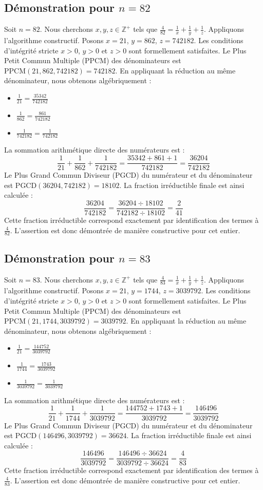 \documentclass[11pt,a4paper]{article}
\begin{document}
\subsection{Démonstration pour $n = 82$}
Soit $n = 82$. Nous cherchons $x, y, z \in \mathbb{Z}^{+}$ tels que $\frac{4}{82} = \frac{1}{x} + \frac{1}{y} + \frac{1}{z}$.
Appliquons l'algorithme constructif. Posons $x = 21$, $y = 862$, $z = 742182$.
Les conditions d'intégrité stricte $x > 0$, $y > 0$ et $z > 0$ sont formellement satisfaites.
Le Plus Petit Commun Multiple (PPCM) des dénominateurs est $\text{PPCM}(21, 862, 742182) = 742182$.
En appliquant la réduction au même dénominateur, nous obtenons algébriquement :
\begin{itemize}
    \item $\frac{1}{21} = \frac{35342}{742182}$
    \item $\frac{1}{862} = \frac{861}{742182}$
    \item $\frac{1}{742182} = \frac{1}{742182}$
\end{itemize}
La sommation arithmétique directe des numérateurs est :
$$ \frac{1}{21} + \frac{1}{862} + \frac{1}{742182} = \frac{35342 + 861 + 1}{742182} = \frac{36204}{742182} $$
Le Plus Grand Commun Diviseur (PGCD) du numérateur et du dénominateur est $\text{PGCD}(36204, 742182) = 18102$.
La fraction irréductible finale est ainsi calculée :
$$ \frac{36204}{742182} = \frac{36204 \div 18102}{742182 \div 18102} = \frac{2}{41} $$
Cette fraction irréductible correspond exactement par identification des termes à $\frac{4}{82}$. L'assertion est donc démontrée de manière constructive pour cet entier.

\subsection{Démonstration pour $n = 83$}
Soit $n = 83$. Nous cherchons $x, y, z \in \mathbb{Z}^{+}$ tels que $\frac{4}{83} = \frac{1}{x} + \frac{1}{y} + \frac{1}{z}$.
Appliquons l'algorithme constructif. Posons $x = 21$, $y = 1744$, $z = 3039792$.
Les conditions d'intégrité stricte $x > 0$, $y > 0$ et $z > 0$ sont formellement satisfaites.
Le Plus Petit Commun Multiple (PPCM) des dénominateurs est $\text{PPCM}(21, 1744, 3039792) = 3039792$.
En appliquant la réduction au même dénominateur, nous obtenons algébriquement :
\begin{itemize}
    \item $\frac{1}{21} = \frac{144752}{3039792}$
    \item $\frac{1}{1744} = \frac{1743}{3039792}$
    \item $\frac{1}{3039792} = \frac{1}{3039792}$
\end{itemize}
La sommation arithmétique directe des numérateurs est :
$$ \frac{1}{21} + \frac{1}{1744} + \frac{1}{3039792} = \frac{144752 + 1743 + 1}{3039792} = \frac{146496}{3039792} $$
Le Plus Grand Commun Diviseur (PGCD) du numérateur et du dénominateur est $\text{PGCD}(146496, 3039792) = 36624$.
La fraction irréductible finale est ainsi calculée :
$$ \frac{146496}{3039792} = \frac{146496 \div 36624}{3039792 \div 36624} = \frac{4}{83} $$
Cette fraction irréductible correspond exactement par identification des termes à $\frac{4}{83}$. L'assertion est donc démontrée de manière constructive pour cet entier.
\end{document}
